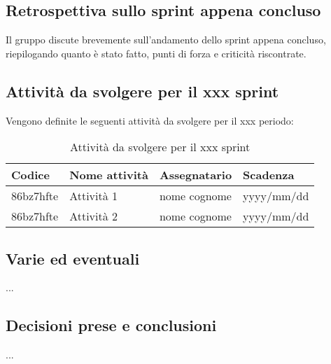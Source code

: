 \documentclass[italian,12pt]{article}
\begin{document}
\subsection{Retrospettiva sullo sprint appena concluso}
Il gruppo discute brevemente sull'andamento dello sprint appena concluso, riepilogando quanto è stato fatto, punti di forza e criticità riscontrate. %

\subsection{Attività da svolgere per il xxx sprint} %
Vengono definite le seguenti attività da svolgere per il xxx periodo: %

\begin{table}[!h]
	\centering
	\begin{tabular}{ |l||l|l|l| }
		\hline
		\textbf{Codice} & \textbf{Nome attività} & \textbf{Assegnatario} & \textbf{Scadenza} \\
		\hline
		86bz7hfte       & Attività 1             & nome cognome        & yyyy/mm/dd \\
		86bz7hfte       & Attività 2             & nome cognome        & yyyy/mm/dd \\
		\hline
	\end{tabular}
	\caption{Attività da svolgere per il xxx sprint} %
\end{table}

\subsection{Varie ed eventuali}
...

\subsection{Decisioni prese e conclusioni}
...
\end{document}
